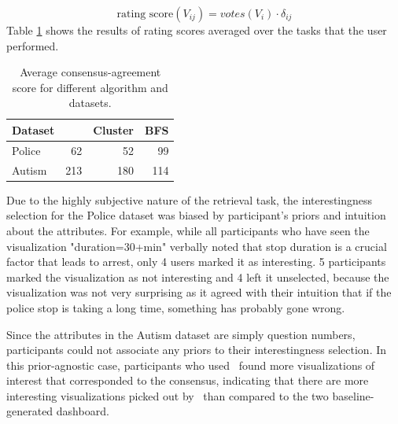 \begin{equation}\label{rank}
\textrm{rating score}(V_{ij}) =votes(V_i) \cdot \delta_{ij}
\end{equation}
Table \ref{interesting_score} shows the results of rating scores averaged over the tasks that the user performed.
\begin{table}[ht!]
	\centering
	\begin{tabular}{lrrr}
		\hline
		 Dataset   &   \system &   Cluster &   BFS \\
		\hline
		 Police    &        62 &        52 &    99 \\
		 Autism    &       213 &       180 &   114 \\
		\hline
	\end{tabular}
	\caption{Average consensus-agreement score for different algorithm and datasets.}
	\label{interesting_score}
\end{table}
\par Due to the highly subjective nature of the retrieval task, the interestingness selection for the Police dataset was biased by participant's priors and intuition about the attributes. For example, while all participants who have seen the visualization "duration=30+min" verbally noted that stop duration is a crucial factor that leads to arrest, only 4 users marked it as interesting. 5 participants marked the visualization as not interesting and 4 left it unselected, because the visualization was not very surprising as it agreed with their intuition that if the police stop is taking a long time, something has probably gone wrong.
\par Since the attributes in the Autism dataset are simply question numbers, participants could not associate any priors to their interestingness selection. In this prior-agnostic case, participants who used \system\ found more visualizations of interest that corresponded to the consensus, indicating that there are more interesting visualizations picked out by \system\ than compared to the two baseline-generated dashboard.  

